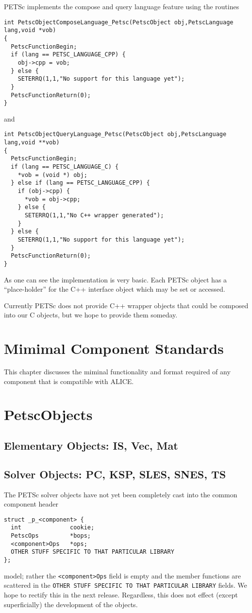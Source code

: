\documentclass[twoside,12pt]{../sty/report_petsc}
\begin{document}
PETSc implements the compose and query language feature using the routines
\begin{verbatim}
int PetscObjectComposeLanguage_Petsc(PetscObject obj,PetscLanguage lang,void *vob)
{
  PetscFunctionBegin;
  if (lang == PETSC_LANGUAGE_CPP) {
    obj->cpp = vob;
  } else {
    SETERRQ(1,1,"No support for this language yet");
  }
  PetscFunctionReturn(0);
}
\end{verbatim}
and
\begin{verbatim}
int PetscObjectQueryLanguage_Petsc(PetscObject obj,PetscLanguage lang,void **vob)
{
  PetscFunctionBegin;
  if (lang == PETSC_LANGUAGE_C) {
    *vob = (void *) obj;
  } else if (lang == PETSC_LANGUAGE_CPP) {
    if (obj->cpp) {
      *vob = obj->cpp;
    } else {
      SETERRQ(1,1,"No C++ wrapper generated");
    }
  } else {
    SETERRQ(1,1,"No support for this language yet");
  }
  PetscFunctionReturn(0);
}
\end{verbatim}
As one can see the implementation is very basic. Each PETSc object has a
``place-holder'' for the C++ interface object which may be set or accessed.

Currently PETSc does not provide C++ wrapper objects that could be
composed into our C objects, but we hope to provide them someday.

\chapter{Mimimal Component Standards}
This chapter discusses the miminal functionality and format required of any 
component that is compatible with ALICE. 

\chapter{PetscObjects}

\section{Elementary Objects: IS, Vec, Mat}

\section{Solver Objects: PC, KSP, SLES, SNES, TS}

The PETSc solver objects have not yet been completely cast into the common component 
header 
\begin{verbatim}
struct _p_<component> {
  int              cookie;                                  
  PetscOps         *bops;                                   
  <component>Ops   *ops;       
  OTHER STUFF SPECIFIC TO THAT PARTICULAR LIBRARY
};
\end{verbatim}
model; rather the {\tt <component>Ops} field is empty and the member functions
are scattered in the {\tt OTHER STUFF SPECIFIC TO THAT PARTICULAR LIBRARY}
fields. We hope to rectify this in the next release. Regardless, this does not
effect (except superficially) the development of the objects.
\end{document}
